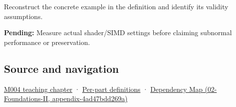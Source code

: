 Reconstruct the concrete example in the definition and identify its validity assumptions.

\textbf{Pending:} Measure actual shader/SIMD settings before claiming subnormal performance or preservation.

\subsection{Source and navigation}\label{appendix-e979eb012782-source-and-navigation}

\hyperref[01-foundations-i-ch001-a-stretching-ruler-for-real-valued-quantities]{M004 teaching chapter} · \hyperref[appendix-fd090d982a15-m004---parts-61-76]{Per-part definitions} · \href{../02-Foundations-II/main.pdf\#nameddest=appendix-4ad47bdd269a}{Dependency Map (02-Foundations-II, appendix-4ad47bdd269a)}
